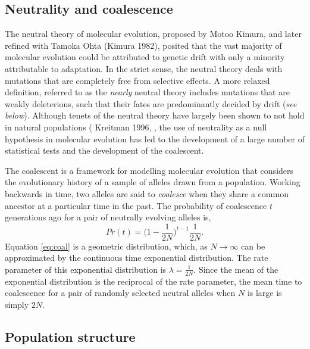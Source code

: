 \subsection{Neutrality and coalescence}

	The neutral theory of molecular evolution, proposed by Motoo Kimura, and later refined with Tamoka Ohta (Kimura 1982), posited that the vast majority of molecular evolution could be attributed to genetic drift with only a minority attributable to adaptation. In the strict sense, the neutral theory deals with mutations that are completely free from selective effects. A more relaxed definition, referred to as the \textit{nearly} neutral theory includes mutations that are weakly deleterious, such that their fates are predominantly decided by drift (\textit{see below}). Although tenets of the neutral theory have largely been shown to not hold in natural populations ( Kreitman 1996, \citep{RN358, RN357}, the use of neutrality as a null hypothesis in molecular evolution has led to the development of a large number of statistical tests and the development of the coalescent.

	The coalescent is a framework for modelling molecular evolution that considers the evolutionary history of a sample of alleles drawn from a population. Working backwards in time, two alleles are said to \textit{coalesce} when they share a common ancestor at a particular time in the past. The probability of coalescence $t$ generations ago for a pair of neutrally evolving alleles is,
	\begin{equation}
	Pr(t) = \Big(1 - \frac{1}{2N}\Big)^{t-1}\frac{1}{2N}.
	\label{eq:coal}
	\end{equation}
\noindent
Equation \ref{eq:coal} is a geometric distribution, which, as $N \to \infty$ can be approximated by the continuous time exponential distribution. The rate parameter of this exponential distribution is $\lambda = \frac{1}{2N}$. Since the mean of the exponential distribution is the reciprocal of the rate parameter, the mean time to coalescence for a pair of randomly selected neutral alleles  when $N$ is large is simply $2N$.
		
\subsection{Population structure}

